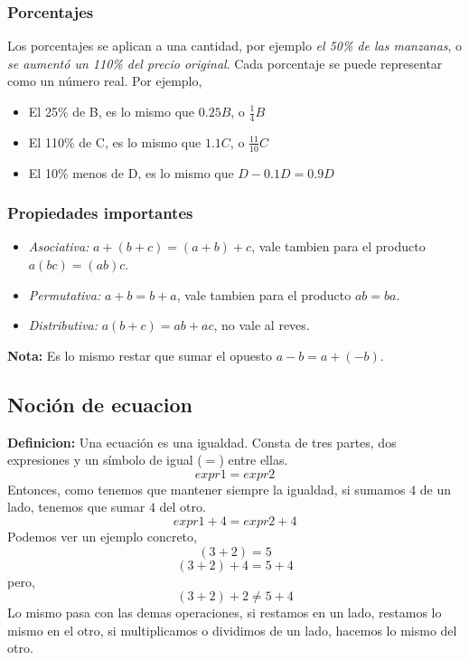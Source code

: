 \documentclass{article}
\begin{document}
\subsubsection*{Porcentajes}
\begin{normalsize}
Los porcentajes se aplican a una cantidad, por ejemplo \textit{el 50\% de las manzanas}, o \textit{se aumentó un 110\% del precio original}.
Cada porcentaje se puede representar como un número real.
Por ejemplo,
\begin{itemize}
	\item El 25\% de B, es lo mismo que $0.25B$, o $\frac{1}{4}B$
	\item El 110\% de C, es lo mismo que $1.1C$, o $\frac{11}{10}C$
	\item El 10\% menos de D, es lo mismo que $D-0.1D=0.9D$
\end{itemize}
\end{normalsize}

\subsubsection*{Propiedades importantes}
\begin{normalsize}
\begin{itemize}
	\item \textit{Asociativa:} $a+(b+c)=(a+b)+c$, vale tambien para el producto $a(bc)=(ab)c$.
	\item \textit{Permutativa:} $a+b=b+a$, vale tambien para el producto $ab=ba$.
	\item \textit{Distributiva:} $a(b+c)=ab+ac$, no vale al reves.
\end{itemize}

\textbf{Nota:} Es lo mismo restar que sumar el opuesto $a-b=a+(-b)$.
\end{normalsize}

\subsection{Noción de ecuacion}
\begin{normalsize}
\textbf{Definicion:} Una ecuación es una igualdad. Consta de tres partes, dos expresiones y un símbolo de igual ($=$) entre ellas.
\[expr1=expr2\]
Entonces, como tenemos que mantener siempre la igualdad, si sumamos $4$ de un lado, tenemos que sumar $4$ del otro.
\[expr1+4=expr2+4\]
Podemos ver un ejemplo concreto,
\[(3+2)=5\]
\[(3+2)+4=5+4\]
pero,
\[(3+2)+2\neq5+4\]
Lo mismo pasa con las demas operaciones, si restamos en un lado, restamos lo mismo en el otro, si multiplicamos o dividimos de un lado, hacemos lo mismo del otro.
\end{normalsize}
\end{document}
